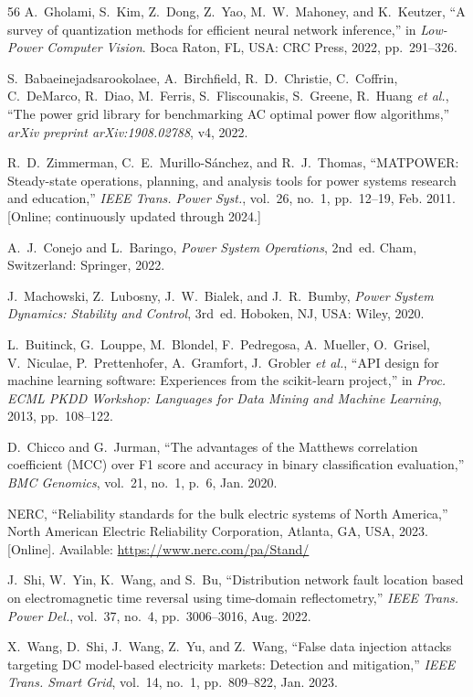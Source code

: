 \documentclass[journal]{IEEEtran}
\begin{document}
\begin{thebibliography}{56}
 A.~Gholami, S.~Kim, Z.~Dong, Z.~Yao, M.~W.~Mahoney, and K.~Keutzer, ``A survey of quantization methods for efficient neural network inference,'' in \textit{Low-Power Computer Vision}. Boca Raton, FL, USA: CRC Press, 2022, pp.~291--326.

 S.~Babaeinejadsarookolaee, A.~Birchfield, R.~D.~Christie, C.~Coffrin, C.~DeMarco, R.~Diao, M.~Ferris, S.~Fliscounakis, S.~Greene, R.~Huang \emph{et al.}, ``The power grid library for benchmarking AC optimal power flow algorithms,'' \textit{arXiv preprint arXiv:1908.02788}, v4, 2022.

 R.~D.~Zimmerman, C.~E.~Murillo-S\'{a}nchez, and R.~J.~Thomas, ``MATPOWER: Steady-state operations, planning, and analysis tools for power systems research and education,'' \textit{IEEE Trans. Power Syst.}, vol.~26, no.~1, pp.~12--19, Feb. 2011. [Online; continuously updated through 2024.]

 A.~J.~Conejo and L.~Baringo, \textit{Power System Operations}, 2nd~ed. Cham, Switzerland: Springer, 2022.

 J.~Machowski, Z.~Lubosny, J.~W.~Bialek, and J.~R.~Bumby, \textit{Power System Dynamics: Stability and Control}, 3rd~ed. Hoboken, NJ, USA: Wiley, 2020.

 L.~Buitinck, G.~Louppe, M.~Blondel, F.~Pedregosa, A.~Mueller, O.~Grisel, V.~Niculae, P.~Prettenhofer, A.~Gramfort, J.~Grobler \emph{et al.}, ``API design for machine learning software: Experiences from the scikit-learn project,'' in \textit{Proc. ECML PKDD Workshop: Languages for Data Mining and Machine Learning}, 2013, pp.~108--122.

 D.~Chicco and G.~Jurman, ``The advantages of the Matthews correlation coefficient (MCC) over F1 score and accuracy in binary classification evaluation,'' \textit{BMC Genomics}, vol.~21, no.~1, p.~6, Jan. 2020.

 NERC, ``Reliability standards for the bulk electric systems of North America,'' North American Electric Reliability Corporation, Atlanta, GA, USA, 2023. [Online]. Available: \url{https://www.nerc.com/pa/Stand/}

 J.~Shi, W.~Yin, K.~Wang, and S.~Bu, ``Distribution network fault location based on electromagnetic time reversal using time-domain reflectometry,'' \textit{IEEE Trans. Power Del.}, vol.~37, no.~4, pp.~3006--3016, Aug. 2022.

 X.~Wang, D.~Shi, J.~Wang, Z.~Yu, and Z.~Wang, ``False data injection attacks targeting DC model-based electricity markets: Detection and mitigation,'' \textit{IEEE Trans. Smart Grid}, vol.~14, no.~1, pp.~809--822, Jan. 2023.


\end{thebibliography}
\end{document}
